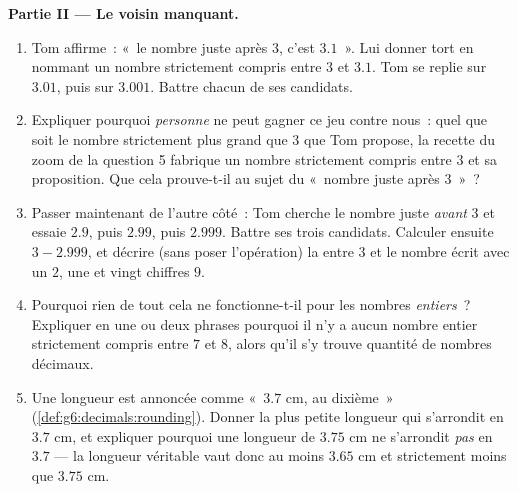\begin{problem}
\medskip
\noindent\textbf{Partie II --- Le voisin manquant.}
\begin{enumerate}[resume]
  \item Tom affirme~: «~le nombre juste après $3$, c'est $3.1$~».
        Lui donner tort en nommant un nombre strictement compris
        entre $3$ et $3.1$. Tom se replie sur $3.01$, puis sur
        $3.001$. Battre chacun de ses candidats.
  \item Expliquer pourquoi \emph{personne} ne peut gagner ce jeu
        contre nous~: quel que soit le nombre strictement plus grand
        que $3$ que Tom propose, la recette du zoom de la question 5
        fabrique un nombre strictement compris entre $3$ et sa
        proposition. Que cela prouve-t-il au sujet du «~nombre juste
        après $3$~»~?
  \item Passer maintenant de l'autre côté~: Tom cherche le nombre
        juste \emph{avant} $3$ et essaie $2.9$, puis $2.99$, puis
        $2.999$. Battre ses trois candidats. Calculer ensuite
        $3 - 2.999$, et décrire (sans poser l'opération) la
         entre $3$ et le nombre écrit avec un $2$, une
         et vingt chiffres $9$.
  \item Pourquoi rien de tout cela ne fonctionne-t-il pour les
        nombres \emph{entiers}~? Expliquer en une ou deux phrases
        pourquoi il n'y a aucun nombre entier strictement compris
        entre $7$ et $8$, alors qu'il s'y trouve quantité de nombres
        décimaux.
  \item Une longueur est annoncée comme «~$3.7$ cm,  au
        dixième~» (\cref{def:g6:decimals:rounding}). Donner la plus
        petite longueur qui s'arrondit en $3.7$ cm, et expliquer
        pourquoi une longueur de $3.75$ cm ne s'arrondit
        \emph{pas} en $3.7$ --- la longueur véritable vaut donc au
        moins $3.65$ cm et strictement moins que $3.75$ cm.
\end{enumerate}


\end{problem}
